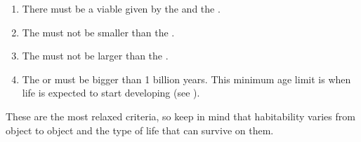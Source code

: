 \documentclass[letterpaper,10pt,english]{sphinxmanual}
\begin{document}
\begin{enumerate}
%
\item {} 
\sphinxAtStartPar
There must be a viable {\hyperref[\detokenize{quantities/habitability/habitable_zones/average_habitable_zone:id1}]{}} given by the {\hyperref[\detokenize{quantities/insolation_models/relaxed_minimum_limit:id1}]{}} and the {\hyperref[\detokenize{quantities/insolation_models/relaxed_maximum_limit:id1}]{}}.

\item {} 
\sphinxAtStartPar
The {\hyperref[\detokenize{quantities/insolation_models/relaxed_maximum_limit:id1}]{}} must not be smaller than the {\hyperref[\detokenize{quantities/children_orbit_limits/inner_orbit_limit:id1}]{}}.

\item {} 
\sphinxAtStartPar
The {\hyperref[\detokenize{quantities/insolation_models/relaxed_minimum_limit:id1}]{}} must not be larger than the {\hyperref[\detokenize{quantities/children_orbit_limits/outer_orbit_limit:id1}]{}}.

\item {} 
\sphinxAtStartPar
The {\hyperref[\detokenize{quantities/life/lifetime:id1}]{}} or {\hyperref[\detokenize{quantities/life/age:id1}]{}}  must be bigger than 1 billion years. This minimum age limit is when life is expected to start developing (see ).

\end{enumerate}

\sphinxAtStartPar
These are the most relaxed criteria, so keep in mind that habitability varies
from object to object and the type of life that can survive on them.
\end{document}
